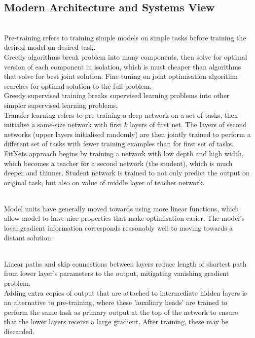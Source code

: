 \subsection{Modern Architecture and Systems View}

\begin{remark} \\
Pre-training refers to training simple models on simple tasks before training the desired model on desired task.\\
Greedy algorithms break problem into many components, then solve for optimal version of each component in isolation, which is must cheaper than algorithms that solve for best joint solution. Fine-tuning on joint optimisation algorithm searches for optimal solution to the full problem.\\
Greedy supervised training breaks supervised learning problems into other simpler supervised learning problems.\\
Transfer learning refers to pre-training a deep network on a set of tasks, then initialise a same-size network with first $k$ layers of first net. The layers of second networks (upper layers initialised randomly) are then jointly trained to perform a different set of tasks with fewer training examples than for first set of tasks.\\
FitNets approach begins by training a network with low depth and high width, which becomes a teacher for a second network (the student), which is much deeper and thinner. Student network is trained to not only predict the output on original task, but also on value of middle layer of teacher network.
\end{remark}

\begin{remark} \\
Model units have generally moved towards using more linear functions, which allow model to have nice properties that make optimisation easier. The model's local gradient information corresponds reasonably well to moving towards a distant solution.
\end{remark}

\begin{remark} \\
Linear paths and skip connections between layers reduce length of shortest path from lower layer's parameters to the output, mitigating vanishing gradient problem.\\
Adding extra copies of output that are attached to intermediate hidden layers is an alternative to pre-training, where these 'auxiliary heads' are trained to perform the same task as primary output at the top of the network to ensure that the lower layers receive a large gradient. After training, these may be discarded.
\end{remark}

